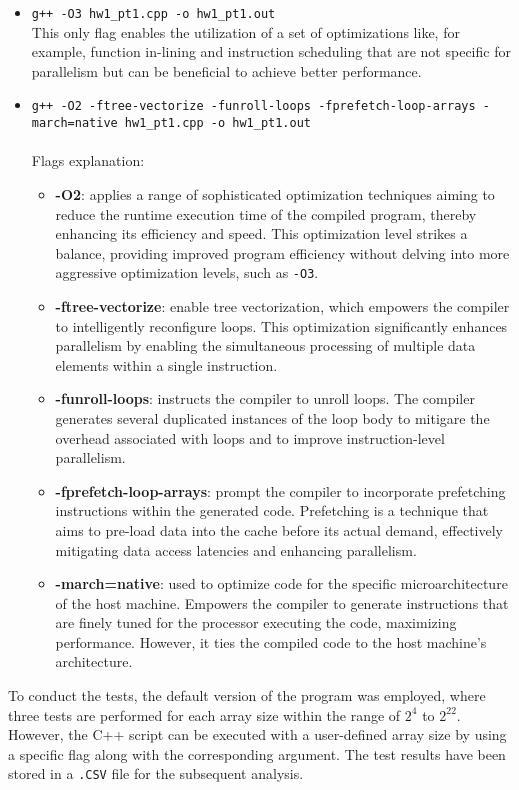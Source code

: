 \documentclass{article}
\begin{document}
\begin{itemize}
  \item \texttt{g++ -O3 hw1\_pt1.cpp -o hw1\_pt1.out}\\
  This only flag enables the utilization of a set of optimizations like, for example, function in-lining and instruction scheduling that are not specific for parallelism but can be beneficial to achieve better performance.
  \item \texttt{g++ -O2 -ftree-vectorize -funroll-loops -fprefetch-loop-arrays -march=native hw1\_pt1.cpp -o hw1\_pt1.out}\\\\
  Flags explanation:
    \begin{itemize}
        \item[] \textbf{-O2}: applies a range of sophisticated optimization techniques aiming to reduce the runtime execution time of the compiled program, thereby enhancing its efficiency and speed. 
        This optimization level strikes a balance, providing improved program efficiency without delving into more aggressive optimization levels, such as \texttt{-O3}.
        \item[] \textbf{-ftree-vectorize}: enable tree vectorization, which empowers the compiler to intelligently reconfigure loops. This optimization significantly enhances parallelism by enabling the simultaneous processing of multiple data elements within a single instruction.
        \item[] \textbf{-funroll-loops}: instructs the compiler to unroll loops. The compiler generates several duplicated instances of the loop body to mitigare the overhead associated with loops and to improve instruction-level parallelism.
        \item[] \textbf{-fprefetch-loop-arrays}: prompt the compiler to incorporate prefetching instructions within the generated code. Prefetching is a technique that aims to pre-load data into the cache before its actual demand, effectively mitigating data access latencies and enhancing parallelism.
        \item[] \textbf{-march=native}: used to optimize code for the specific microarchitecture of the host machine. Empowers the compiler to generate instructions that are finely tuned for the processor executing the code, maximizing performance. However, it ties the compiled code to the host machine's architecture.
    \end{itemize}
\end{itemize}
To conduct the tests, the default version of the program was employed, where three tests are performed for each array size within the range of $2^4$ to $2^{22}$. However, the C++ script can be executed with a user-defined array size by using a specific flag along with the corresponding argument. The test results have been stored in a \texttt{.CSV} file for the subsequent analysis. 
\end{document}
